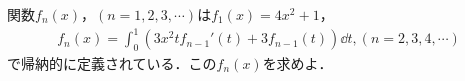 \documentclass[../../main.tex]{subfiles}
\begin{document}
関数$f_n(x)$，$(n=1,2,3,\cdots)$は$f_1(x)=4x^2+1$，
\begin{align*}
  f_n(x)=\int_{0}^{1}\left(3x^2tf_{n-1}'(t)+3f_{n-1}(t)\right)\dd t, (n=2,3,4,\cdots)
\end{align*}
で帰納的に定義されている．この$f_n(x)$を求めよ．
\end{document}

